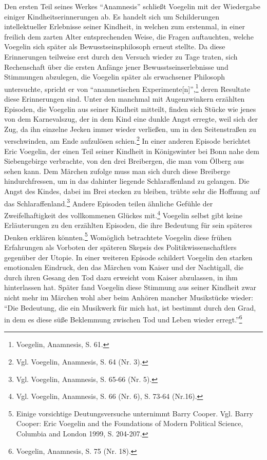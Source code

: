 Den ersten Teil seines Werkes "`Anamnesis"' schließt Voegelin mit der
Wiedergabe einiger Kindheitserinnerungen ab. Es handelt sich um Schilderungen
intellektueller Erlebnisse seiner Kindheit, in welchen zum erstenmal, in einer
freilich dem zarten Alter entsprechenden Weise, die Fragen auftauchten, welche
Voegelin sich später als Bewusstseinsphilosoph erneut stellte. Da diese
Erinnerungen teilweise erst durch den Versuch wieder zu Tage traten, sich
Rechenschaft über die ersten Anfänge jener Bewusstseinserlebnisse und
Stimmungen abzulegen, die Voegelin später als erwachsener Philosoph
untersuchte, spricht er von "`anamnetischen
Experimente[n]"',\footnote{Voegelin, Anamnesis, S. 61.}  deren Resultate diese
Erinnerungen sind. Unter den manchmal mit Augenzwinkern erzählten Episoden,
die Voegelin aus seiner Kindheit mitteilt, finden sich Stücke wie jenes von
dem Karnevalszug, der in dem Kind eine dunkle Angst erregte, weil sich der
Zug, da ihn einzelne Jecken immer wieder verließen, um in den Seitenstraßen zu
verschwinden, am Ende aufzulösen schien.\footnote{Vgl.  Voegelin, Anamnesis,
  S. 64 (Nr.  3).}  In einer anderen Episode berichtet Eric Voegelin, der
einen Teil seiner Kindheit in Königswinter bei Bonn nahe dem Siebengebirge
verbrachte, von den drei Breibergen, die man vom Ölberg aus sehen kann. Dem
Märchen zufolge muss man sich durch diese Breiberge hindurchfressen, um in das
dahinter liegende Schlaraffenland zu gelangen. Die Angst des Kindes, dabei im
Brei stecken zu bleiben, trübte sehr die Hoffnung auf das
Schlaraffenland.\footnote{Vgl. Voegelin, Anamnesis, S. 65-66 (Nr. 5).}  Andere
Episoden teilen ähnliche Gefühle der Zweifelhaftigkeit des vollkommenen
Glückes mit.\footnote{Vgl. Voegelin, Anamnesis, S. 66 (Nr. 6), S. 73-64
  (Nr.16).}  Voegelin selbst gibt keine Erläuterungen zu den erzählten
Episoden, die ihre Bedeutung für sein späteres Denken erklären
könnten.\footnote{Einige vorsichtige Deutungsversuche unternimmt Barry Cooper.
  Vgl. Barry Cooper: Eric Voegelin and the Foundations of Modern Political
  Science, Columbia and London 1999, S. 204-207.} Womöglich betrachtete
Voegelin diese frühen Erfahrungen als Vorboten der späteren Skepsis des
Politikwissenschaftlers gegenüber der Utopie. In einer weiteren Episode
schildert Voegelin den starken emotionalen Eindruck, den das Märchen vom
Kaiser und der Nachtigall, die durch ihren Gesang den Tod dazu erweicht vom
Kaiser abzulassen, in ihm hinterlassen hat. Später fand Voegelin diese
Stimmung aus seiner Kindheit zwar nicht mehr im Märchen wohl aber beim Anhören
mancher Musikstücke wieder: "`Die Bedeutung, die ein Musikwerk für mich hat,
ist bestimmt durch den Grad, in dem es diese süße Beklemmung zwischen Tod und
Leben wieder erregt."'\footnote{Voegelin, Anamnesis, S. 75 (Nr. 18).}
 
